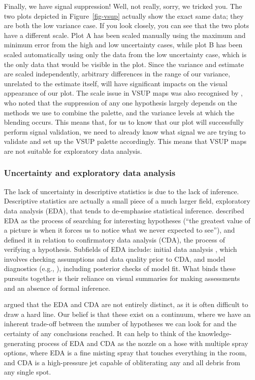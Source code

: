 \documentclass[]{ar-1col-S2O}
\begin{document}
Finally, we have signal suppression! Well, not really, sorry, we tricked
you. The two plots depicted in Figure~\ref{fig-vsup} actually show the
exact same data; they are both the low variance case. If you look
closely, you can see that the two plots have a different scale. Plot A
has been scaled manually using the maximum and minimum error from the
high and low uncertainty cases, while plot B has been scaled
automatically using only the data from the low uncertainty case, which
is the only data that would be visible in the plot. Since the variance
and estimate are scaled independently, arbitrary differences in the
range of our variance, unrelated to the estimate itself, will have
significant impacts on the visual appearance of our plot. The scale
issue in VSUP maps was also recognised by \citet{Kay2019}, who noted
that the suppression of any one hypothesis largely depends on the
methods we use to combine the palette, and the variance levels at which
the blending occurs. This means that, for us to know that our plot will
successfully perform signal validation, we need to already know what
signal we are trying to validate and set up the VSUP palette
accordingly. This means that VSUP maps are not suitable for exploratory
data analysis.

\subsubsection{Uncertainty and exploratory data
analysis}\label{uncertainty-and-exploratory-data-analysis}

The lack of uncertainty in descriptive statistics is due to the lack of
inference. Descriptive statistics are actually a small piece of a much
larger field, exploratory data analysis (EDA), that tends to
de-emphasise statistical inference. \citet{Tukey1977} described EDA as
the process of searching for interesting hypotheses (``the greatest
value of a picture is when it forces us to notice what we never expected
to see''), and defined it in relation to confirmatory data analysis
(CDA), the process of verifying a hypothesis. Subfields of EDA include:
initial data analysis \citep{huebner2016, chatfield}, which involves
checking assumptions and data quality prior to CDA, and model
diagnostics (e.g., \citet{bkw1980}), including posterior checks of model
fit. What binds these pursuits together is their reliance on visual
summaries for making assessments and an absence of formal inference.

\citet{Hullman2021} argued that the EDA and CDA are not entirely
distinct, as it is often difficult to draw a hard line. Our belief is
that these exist on a continuum, where we have an inherent trade-off
between the number of hypotheses we can look for and the certainty of
any conclusions reached. It can help to think of the
knowledge-generating process of EDA and CDA as the nozzle on a hose with
multiple spray options, where EDA is a fine misting spray that touches
everything in the room, and CDA is a high-pressure jet capable of
obliterating any and all debris from any single spot.
\end{document}
